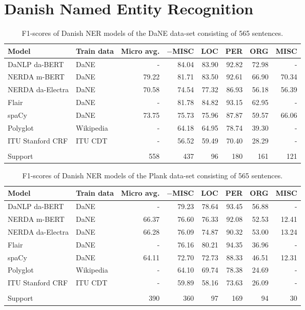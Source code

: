 \documentclass[main.tex]{subfiles}
\begin{document}
\section{Danish Named Entity Recognition}%
\label{sec:Danish Named Entity Recognition}
\begin{table}[H]
	\begin{center}
		\begin{tabular}{l l r r r r r r}
			Model & Train data & Micro avg. & $-$MISC & LOC & PER & ORG & MISC \\
			\hline
			DaNLP da-BERT & DaNE & - & 84.04 & 83.90 & 92.82 & 72.98 & - \\
			NERDA m-BERT & DaNE & 79.22 & 81.71 & 83.50 & 92.61 & 66.90 & 70.34 \\
			NERDA da-Electra & DaNE & 70.58 & 74.54 & 77.32 & 86.93 & 56.18 & 56.39 \\
			Flair & DaNE & - & 81.78 & 84.82 & 93.15 & 62.95 & - \\
			spaCy & DaNE & 73.75 & 75.73 & 75.96 & 87.87 & 59.57 & 66.06 \\
			Polyglot & Wikipedia & - & 64.18 & 64.95 & 78.74 & 39.30 & - \\
			ITU Stanford CRF & ITU CDT & - & 56.52 & 59.49 & 70.40 & 28.29 & - \\
			 &  &  &  &  &  &  &  \\
			Support &  & 558 & 437 & 96 & 180 & 161 & 121 \\
		\end{tabular}
	\end{center}
	\caption{F1\pro-scores of Danish NER models of the DaNE data-set consisting of 565 sentences.}
	\label{tab:DaNE}
\end{table}

\begin{table}[H]
	\begin{center}
		\begin{tabular}{l l r r r r r r}
			Model & Train data & Micro avg. & $-$MISC & LOC & PER & ORG & MISC \\
			\hline
			DaNLP da-BERT & DaNE & - & 79.23 & 78.64 & 93.45 & 56.88 & - \\
			NERDA m-BERT & DaNE & 66.37 & 76.60 & 76.33 & 92.08 & 52.53 & 12.41 \\
			NERDA da-Electra & DaNE & 66.28 & 76.09 & 74.87 & 90.32 & 53.00 & 13.24 \\
			Flair & DaNE & - & 76.16 & 80.21 & 94.35 & 36.96 & - \\
			spaCy & DaNE & 64.11 & 72.70 & 72.73 & 88.33 & 46.51 & 12.31 \\
			Polyglot & Wikipedia & - & 64.10 & 69.74 & 78.38 & 24.69 & - \\
			ITU Stanford CRF & ITU CDT & - & 59.89 & 58.16 & 73.63 & 26.09 & - \\
			 &  &  &  &  &  &  &  \\
			Support &  & 390 & 360 & 97 & 169 & 94 & 30 \\
		\end{tabular}
	\end{center}
	\caption{F1\pro-scores of Danish NER models of the Plank data-set consisting of 565 sentences.}
	\label{tab:Plank}
\end{table}
\end{document}
